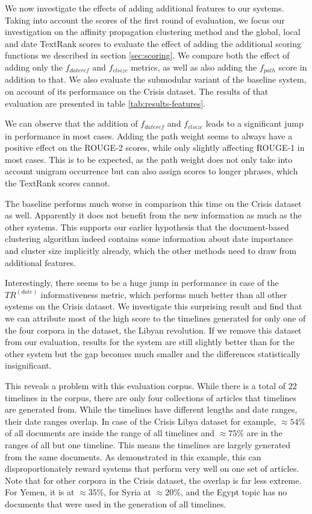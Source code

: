 \documentclass[a4paper,BCOR=10mm]{report}
\numberwithin{lemma}{chapter}
\numberwithin{definition}{chapter}
\begin{document}
We now investigate the effects of adding additional features to our systems.
Taking into account the scores of the first round of evaluation, we focus our investigation on the affinity propagation clustering method and the global, local and date TextRank scores to evaluate the effect of adding the additional scoring functions we described in section \ref{sec:scoring}.
We compare both the effect of adding only the $f_{\mathit{dateref}}$ and $f_{clsize}$ metrics, as well as also adding the $f_{path}$ score in addition to that. We also evaluate the submodular variant of the baseline system, on account of its performance on the Crisis dataset.
The results of that evaluation are presented in table \ref{tab:results-features}.

We can observe that the addition of $f_{\mathit{dateref}}$ and $f_{clsize}$ leads to a significant jump in performance in most cases.
Adding the path weight seems to always have a positive effect on the ROUGE-2 scores, while only slightly affecting ROUGE-1 in most cases.
This is to be expected, as the path weight does not only take into account unigram occurrence but can also assign scores to longer phrases, which the TextRank scores cannot.

The baseline performs much worse in comparison this time on the Crisis dataset as well. Apparently it does not benefit from the new information as much as the other systems. This supports our earlier hypothesis that the document-based clustering algorithm indeed contains some information about date importance and cluster size implicitly already, which the other methods need to draw from additional features.

Interestingly, there seems to be a huge jump in performance in case of the $TR^{(date)}$ informativeness metric, which performs much better than all other systems on the Crisis dataset. We investigate this surprising result and find that we can attribute most of the high score to the timelines generated for only one of the four corpora in the dataset, the Libyan revolution.
If we remove this dataset from our evaluation, results for the system are still slightly better than for the other system but the gap becomes much smaller and the differences statistically insignificant.

This reveals a problem with this evaluation corpus. While there is a total of 22 timelines in the corpus, there are only four collections of articles that timelines are generated from. While the timelines have different lengths and date ranges, their date ranges overlap. In case of the Crisis Libya dataset for example, $\approx 54\%$ of all documents are inside the range of all timelines and $\approx 75\%$ are in the ranges of all but one timeline. This means the timelines are largely generated from the same documents. As demonstrated in this example, this can disproportionately reward systems that perform very well on one set of articles.
Note that for other corpora in the Crisis dataset, the overlap is far less extreme.
For Yemen, it is at $\approx 35\%$, for Syria at $\approx 20\%$, and the Egypt topic has no documents that were used in the generation of all timelines.
\end{document}
